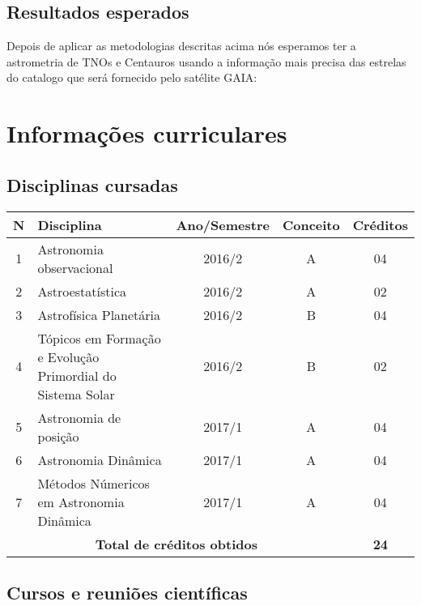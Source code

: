 \documentclass[a4paper, 11pt]{article}
\begin{document}
\subsection{Resultados esperados}

Depois de aplicar as metodologias descritas acima nós esperamos ter a astrometria de TNOs e Centauros usando a informação mais precisa das estrelas do catalogo que será fornecido pelo satélite GAIA:

\section{Informa\c{c}\~oes curriculares}

\subsection{Disciplinas cursadas}

\begin{center}
\begin{tabular}{clccc}
\toprule
\textbf{N}&$\hspace{2cm}$\textbf{Disciplina} &\textbf{Ano/Semestre}&\textbf{Conceito}& \textbf{Cr\'editos} \\ \midrule
1 & Astronomia observacional                                             & 2016/2 & A & 04 \\ 
2 & Astroestatística                                                     & 2016/2 & A & 02 \\ 
3 & Astrofísica Planetária                                               & 2016/2 & B & 04 \\ 
4 & Tópicos em Formação e Evolução Primordial do Sistema Solar           & 2016/2 & B & 02 \\
5 & Astronomia de posição                                                & 2017/1 & A & 04 \\ 
6 & Astronomia Dinâmica                                                  & 2017/1 & A & 04 \\ 
7 & Métodos Númericos em Astronomia Dinâmica                             & 2017/1 & A & 04 \\ \midrule 
\multicolumn{4}{c}{\textbf{Total de cr\'editos obtidos}}               & \textbf{24} \\ \bottomrule
\end{tabular}
\end{center}

\subsection{Cursos e reuni\~oes cient\'ificas}
\end{document}
